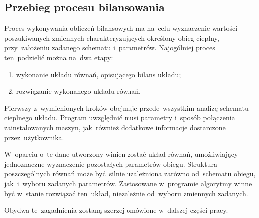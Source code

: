 \subsection{Przebieg procesu bilansowania}

Proces wykonywania obliczeń bilansowych ma na~celu wyznaczenie wartości
poszukiwanych zmiennych charakteryzujących określony obieg cieplny,
przy~założeniu zadanego schematu i~parametrów. Najogólniej proces
ten~podzielić można na~dwa etapy:

\begin{enumerate}

\item wykonanie układu równań, opisującego bilans układu;

\item rozwiązanie wykonanego układu równań.

\end{enumerate}

Pierwszy z~wymienionych kroków obejmuje przede~wszystkim analizę
schematu cieplnego układu. Program uwzględnić musi parametry i~sposób
połączenia zainstalowanych maszyn, jak~również dodatkowe informacje
dostarczone przez~użytkownika.

W~oparciu o~te dane utworzony winien zostać układ równań, umożliwiający
jednoznaczne wyznaczenie pozostałych parametrów obiegu. Struktura
poszczególnych równań może być~silnie uzależniona zarówno od~schematu
obiegu, jak~i~wyboru zadanych parametrów. Zastosowane w~programie
algorytmy winne być w~stanie rozwiązać ten~układ, niezależnie od~wyboru
zmiennych zadanych.

Obydwa te~zagadnienia zostaną szerzej omówione w~dalszej części pracy.
